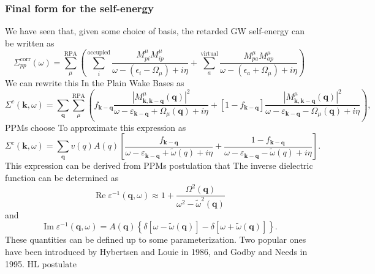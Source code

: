 \subsubsection{Final form for the self-energy}
We have seen that, given some choice of basis, the retarded GW self-energy can be written as 
\begin{equation}
    \Sigma_{pp}^{\text{corr}}(\omega) = \sum_{\mu }^{\text{RPA}}\left(\sum_{i}^{\text{occupied}} \frac{M_{pi}^{\mu }M_{ip}^{\mu }}{\omega -(\epsilon _{i}-\Omega  _{\mu })+i\eta}+ \sum_{a}^{\text{virtual}} \frac{M_{pa}^{\mu }M_{ap}^{\mu }}{\omega -(\epsilon _{a}+\Omega  _{\mu })+i\eta}\right)
\end{equation}
We can rewrite this In the Plain Wake Bases as  
\begin{equation}
\Sigma^c(\mathbf{k}, \omega)=\sum_{\mathbf{q}} \sum_\mu^{\mathrm{RPA}}\left(f_{\mathbf{k}-\mathbf{q}} \frac{\left|M_{\mathbf{k}, \mathbf{k}-\mathbf{q}}^\mu(\mathbf{q})\right|^2}{\omega-\varepsilon_{\mathbf{k}-\mathbf{q}}+\Omega_\mu(\mathbf{q})+i \eta}+\left[1-f_{\mathbf{k}-\mathbf{q}}\right] \frac{\left|M_{\mathbf{k}, \mathbf{k}-\mathbf{q}}^\mu(\mathbf{q})\right|^2}{\omega-\varepsilon_{\mathbf{k}-\mathbf{q}}-\Omega_\mu(\mathbf{q})+i \eta}\right),
\end{equation}
PPMs choose To approximate this expression as 
\begin{equation}
\Sigma^c(\mathbf{k}, \omega)=\sum_{\mathbf{q}} v(q) A(q)\left[\frac{f_{\mathbf{k}-\mathbf{q}}}{\omega-\varepsilon_{\mathbf{k}-\mathbf{q}}+\tilde{\omega}(q)+i \eta}+\frac{1-f_{\mathbf{k}-\mathbf{q}}}{\omega-\varepsilon_{\mathbf{k}-\mathbf{q}}-\tilde{\omega}(q)+i \eta}\right].
\end{equation}
This expression can be derived from PPMs postulation that The inverse dielectric function can be determined as 
\begin{equation}
\operatorname{Re} \varepsilon^{-1}(\mathbf{q}, \omega) \approx 1+\frac{\Omega^2(\mathbf{q})}{\omega^2-\tilde{\omega}^2(\mathbf{q})}
\end{equation}
and
\begin{equation}
    \operatorname{Im} \varepsilon^{-1}(\mathbf{q},\omega ) =A(\mathbf{q})\left\{\delta\left[\omega-\widetilde{\omega}(\mathbf{q})\right]-\delta\left[\omega+\widetilde{\omega}(\mathbf{q})\right]\right\}.
\end{equation}
These quantities can be defined up to some parameterization. Two popular ones have been introduced by Hybertsen and Louie in 1986, and Godby and Needs in 1995. HL postulate
